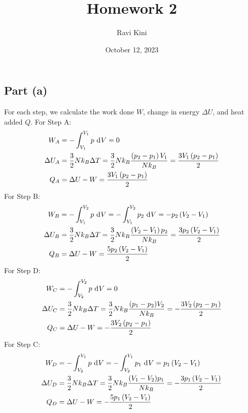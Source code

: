 \documentclass{article}
\title{Homework 2}
\author{Ravi Kini}
\date{October 12, 2023}
\begin{document}
\maketitle

\subsection*{Part (a)}
For each step, we calculate the work done $W$, change in energy $\Delta U$, and heat added $Q$. For Step A:
\begin{equation}
    \begin{split}
        W_A & = -\int_{V_1}^{V_1} p \, \diff{V} = 0 \\
        \Delta U_A & = \frac{3}{2}Nk_B \Delta T = \frac{3}{2}Nk_B\frac{\left(p_2 - p_1\right)V_1}{Nk_B} = \frac{3V_1\left(p_2 - p_1\right)}{2} \\
        Q_A & = \Delta U - W = \frac{3V_1\left(p_2 - p_1\right)}{2}
    \end{split}
\end{equation}
For Step B:
\begin{equation}
    \begin{split}
        W_B & = -\int_{V_1}^{V_2} p \, \diff{V} = -\int_{V_1}^{V_2} p_2 \, \diff{V} = -p_2\left(V_2 - V_1\right) \\
        \Delta U_B & = \frac{3}{2}Nk_B \Delta T = \frac{3}{2}Nk_B\frac{\left(V_2 - V_1\right)p_2}{Nk_B} = \frac{3p_2\left(V_2 - V_1\right)}{2} \\
        Q_B & = \Delta U - W = \frac{5p_2\left(V_2 - V_1\right)}{2}
    \end{split}
\end{equation}
For Step D:
\begin{equation}
    \begin{split}
        W_C & = -\int_{V_2}^{V_2} p \, \diff{V} = 0 \\
        \Delta U_C & = \frac{3}{2}Nk_B \Delta T = \frac{3}{2}Nk_B\frac{(p_1 - p_2)V_2}{Nk_B} = -\frac{3V_2\left(p_2 - p_1\right)}{2} \\
        Q_C & = \Delta U - W = -\frac{3V_2\left(p_2 - p_1\right)}{2}
    \end{split}
\end{equation}
For Step C:
\begin{equation}
    \begin{split}
        W_D & = -\int_{V_2}^{V_1} p \, \diff{V} = -\int_{V_2}^{V_1} p_1 \, \diff{V} = p_1\left(V_2 - V_1\right) \\
        \Delta U_D & = \frac{3}{2}Nk_B \Delta T = \frac{3}{2}Nk_B\frac{(V_1 - V_2)p_1}{Nk_B} = -\frac{3p_1\left(V_2 - V_1\right)}{2} \\
        Q_D & = \Delta U - W = -\frac{5p_1\left(V_2 - V_1\right)}{2}
    \end{split}
\end{equation}
\end{document}
